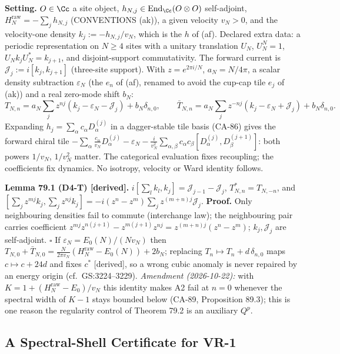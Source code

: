 \textbf{Setting.}  \(O\in\Cc\) a site object, \(h_{N,j}\in\operatorname{End}_\Cc(O\otimes O)\)
self-adjoint, \(H^{\mathrm{raw}}_N=-\sum_j h_{N,j}\) (CONVENTIONS (ak)), a given velocity
\(v_N>0\), and the velocity-one density \(k_j:=-h_{N,j}/v_N\), which is the \(h\) of (af).
Declared extra data: a periodic representation on \(N\ge4\) sites with a unitary
translation \(U_N\), \(U_N^N=1\), \(U_Nk_jU_N^*=k_{j+1}\), and disjoint-support commutativity.
The forward current is \(\mathcal J_j:=i[k_j,k_{j+1}]\) (three-site support).
With \(z=e^{2\pi i/N}\), \(a_N=N/4\pi\), a scalar density subtraction \(\varepsilon_N\)
(the \(e_n\) of (af), renamed to avoid the cup-cap tile \(e_j\) of (ak)) and a
real zero-mode shift \(b_N\):
\begin{equation}\label{eq:79-ks}
  T_{N,n}=a_N\sum_j z^{nj}(k_j-\varepsilon_N-\mathcal J_j)+b_N\delta_{n,0},\qquad
  \bar T_{N,n}=a_N\sum_j z^{-nj}(k_j-\varepsilon_N+\mathcal J_j)+b_N\delta_{n,0}.
\end{equation}
Expanding \(h_j=\sum_\alpha c_\alpha D^{(j)}_\alpha\) in a dagger-stable tile basis (CA-86)
gives the forward chiral tile
\(-\sum_\alpha\frac{c_\alpha}{v_N}D^{(j)}_\alpha-\varepsilon_N
-\frac{i}{v_N^2}\sum_{\alpha,\beta}c_\alpha c_\beta[D^{(j)}_\alpha,D^{(j+1)}_\beta]\):
both powers \(1/v_N\), \(1/v_N^2\) matter.  The categorical evaluation fixes
recoupling; the coefficients fix dynamics.  No isotropy, velocity or Ward identity
follows.

\textbf{Lemma 79.1 (D4-T) [derived].}  \(i[\sum_lk_l,k_j]=\mathcal J_{j-1}-\mathcal J_j\),
\(T_{N,n}^*=T_{N,-n}\), and
\([\sum_jz^{mj}k_j,\sum_jz^{nj}k_j]=-i(z^n-z^m)\sum_jz^{(m+n)j}\mathcal J_j\).
\textbf{Proof.}  Only neighbouring densities fail to commute (interchange law); the
neighbouring pair carries coefficient \(z^{mj}z^{n(j+1)}-z^{m(j+1)}z^{nj}=z^{(m+n)j}(z^n-z^m)\);
\(k_j,\mathcal J_j\) are self-adjoint.  \(\square\)  If \(\varepsilon_N=E_0(N)/(Nv_N)\) then
\(T_{N,0}+\bar T_{N,0}=\frac{N}{2\pi v_N}(H^{\mathrm{raw}}_N-E_0(N))+2b_N\); replacing
\(T_n\mapsto T_n+d\,\delta_{n,0}\) maps \(c\mapsto c+24d\) and fixes \(c^*\) [derived], so
a wrong cubic anomaly is never repaired by an energy origin (cf.\ GS:3224--3229).  \emph{Amendment (2026-10-22):} with
\(K=1+(H^{\mathrm{raw}}_N-E_0)/v_N\) this identity makes A2 fail at \(n=0\) whenever the spectral width of \(K-1\) stays bounded
below (CA-89, Proposition 89.3); this is one reason the regularity control of Theorem 79.2 is an auxiliary \(Q^p\).

\subsection{A Spectral-Shell Certificate for VR-1}

